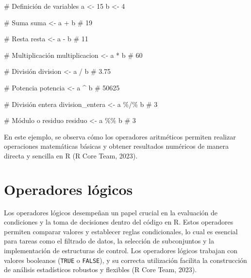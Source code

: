 \documentclass[
  spanish,
  a4paper,
  DIV=11,
  numbers=noendperiod,
  onepage,
  openany]{scrreprt}
\newenvironment{Shaded}{\begin{snugshade}}{\end{snugshade}}
\newcommand{\CommentTok}[1]{\textcolor[rgb]{0.37,0.37,0.37}{#1}}
\newcommand{\DecValTok}[1]{\textcolor[rgb]{0.68,0.00,0.00}{#1}}
\newcommand{\NormalTok}[1]{\textcolor[rgb]{0.00,0.23,0.31}{#1}}
\newcommand{\OtherTok}[1]{\textcolor[rgb]{0.00,0.23,0.31}{#1}}
\newcommand{\SpecialCharTok}[1]{\textcolor[rgb]{0.37,0.37,0.37}{#1}}
\begin{document}
\begin{Shaded}
\begin{Highlighting}[]
\CommentTok{\# Definición de variables}
\NormalTok{a }\OtherTok{\textless{}{-}} \DecValTok{15}
\NormalTok{b }\OtherTok{\textless{}{-}} \DecValTok{4}

\CommentTok{\# Suma}
\NormalTok{suma }\OtherTok{\textless{}{-}}\NormalTok{ a }\SpecialCharTok{+}\NormalTok{ b           }\CommentTok{\# 19}

\CommentTok{\# Resta}
\NormalTok{resta }\OtherTok{\textless{}{-}}\NormalTok{ a }\SpecialCharTok{{-}}\NormalTok{ b          }\CommentTok{\# 11}

\CommentTok{\# Multiplicación}
\NormalTok{multiplicacion }\OtherTok{\textless{}{-}}\NormalTok{ a }\SpecialCharTok{*}\NormalTok{ b }\CommentTok{\# 60}

\CommentTok{\# División}
\NormalTok{division }\OtherTok{\textless{}{-}}\NormalTok{ a }\SpecialCharTok{/}\NormalTok{ b       }\CommentTok{\# 3.75}

\CommentTok{\# Potencia}
\NormalTok{potencia }\OtherTok{\textless{}{-}}\NormalTok{ a }\SpecialCharTok{\^{}}\NormalTok{ b       }\CommentTok{\# 50625}

\CommentTok{\# División entera}
\NormalTok{division\_entera }\OtherTok{\textless{}{-}}\NormalTok{ a }\SpecialCharTok{\%/\%}\NormalTok{ b  }\CommentTok{\# 3}

\CommentTok{\# Módulo o residuo}
\NormalTok{residuo }\OtherTok{\textless{}{-}}\NormalTok{ a }\SpecialCharTok{\%\%}\NormalTok{ b            }\CommentTok{\# 3}
\end{Highlighting}
\end{Shaded}

En este ejemplo, se observa cómo los operadores aritméticos permiten
realizar operaciones matemáticas básicas y obtener resultados numéricos
de manera directa y sencilla en R (R Core Team, 2023).

\section{Operadores lógicos}\label{operadores-luxf3gicos}

Los operadores lógicos desempeñan un papel crucial en la evaluación de
condiciones y la toma de decisiones dentro del código en R. Estos
operadores permiten comparar valores y establecer reglas condicionales,
lo cual es esencial para tareas como el filtrado de datos, la selección
de subconjuntos y la implementación de estructuras de control. Los
operadores lógicos trabajan con valores booleanos (\texttt{TRUE} o
\texttt{FALSE}), y su correcta utilización facilita la construcción de
análisis estadísticos robustos y flexibles (R Core Team, 2023).
\end{document}
